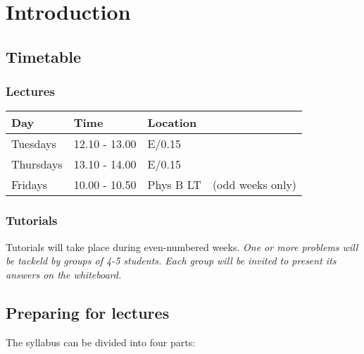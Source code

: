 \chapter{Introduction}\label{chap:intro}


\section{Timetable}

\subsection*{Lectures}

\begin{table}[h]
\centering
\begin{tabular}{|llll|}\hline
Day			& Time			& Location	& \\ \hline
Tuesdays	& 12.10 - 13.00	& E/0.15 	& \\
Thursdays	& 13.10 - 14.00	& E/0.15	& \\
Fridays		& 10.00 - 10.50	& Phys B LT		& (odd weeks only) \\ \hline
\end{tabular}
\end{table}

\subsection*{Tutorials}
Tutorials will take place during even-numbered weeks.
\bit
\it One or more problems will be tackeld by groups of 4-5 students.
\it Each group will be invited to present its answers on the whiteboard.
\eit


\section{Preparing for lectures}

The syllabus can be divided into four parts:

